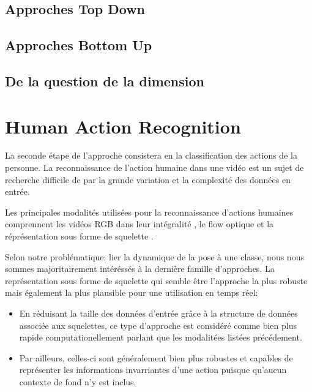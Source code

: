 \label{subsec:SQUEL}
\subsection{Approches Top Down}
\subsection{Approches Bottom Up}
\subsection{De la question de la dimension}

\section{Human Action Recognition}
\label{subsec:HAR}

La seconde étape de l'approche consistera en la classification des actions de la personne. La reconnaissance de l'action humaine dans une vidéo est un sujet de recherche difficile de par la grande variation et la complexité des données en entrée.

Les principales modalités utilisées pour la reconnaissance d'actions humaines comprennent les vidéos RGB dans leur intégralité \cite{donahue2015long,2014arXiv1412.0767T,varol2017long,Wu_2018_CVPR}, le flow optique \cite{simonyan2014two,zhang2016real,sevilla2018integration,DanutPOP} et la réprésentation sous forme de squelette \cite{vemulapalli2014human,du2015hierarchical,2016arXiv160707043L,2018arXiv180107455Y}.

Selon notre problématique: lier la dynamique de la pose à une classe, nous nous sommes majoritairement intéréssés à la dernière famille d'approches. La représentation sous forme de squelette qui semble être l'approche la plus robuste mais également la plus plausible pour une utilisation en temps réel:

\begin{itemize}
    \item En réduisant la taille des données d'entrée grâce à la structure de données associée aux squelettes, ce type d'approche est considéré comme bien plus rapide computationellement parlant que les modalitées listées précédement.
    \item Par ailleurs, celles-ci sont généralement bien plus robustes et capables de représenter les informations invarriantes d'une action puisque qu'aucun contexte de fond n'y est inclus.
\end{itemize}

